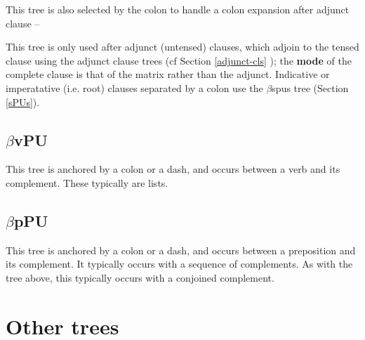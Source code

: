 
This tree is also selected by the colon to handle a colon expansion
after adjunct clause --




This tree is only used after adjunct (untensed) clauses, which adjoin
to the tensed clause using the adjunct clause trees (cf Section
\ref{adjunct-cls} ); the {\bf mode} of the complete clause is that of
the matrix rather than the adjunct. Indicative or imperatative
(i.e. root) clauses separated by a colon use the $\beta$spus tree
(Section \ref{sPUs}).

\subsection{$\beta$vPU}


This tree is anchored by a colon or a dash, and occurs between a verb
and its complement. These typically are lists.


\subsection{$\beta$pPU}

This tree is anchored by a colon or a dash, and occurs between a
preposition and its complement. It typically occurs with a sequence
of complements. As with the tree above, this typically occurs with a
conjoined complement.


\section{Other trees}

